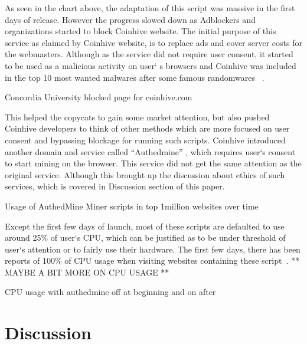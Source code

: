 As seen in the chart above, the adaptation of this script was massive in the first days of release. However the progress slowed down as Adblockers and organizations started to block Coinhive website. The initial purpose of this service as claimed by Coinhive website, is to replace ads and cover server costs for the webmasters. Although as the service did not require user consent, it started to be used as a malicious activity on user` s browsers and Coinhive was included in the top 10 most wanted malwares after some famous randomwares ~\cite{checkpoint}. 

\begin{center}
	\caption{Concordia University blocked page for coinhive.com}
\end{center}

This helped the copycats to gain some market attention, but also pushed Coinhive developers to think of other methods which are more focused on user consent and bypassing blockage for running such scripts. Coinhive introduced another domain and service called ``Authedmine'' , which requires user`s consent to start mining on the browser. This service did not get the same attention as the original service. Although this brought up the discussion about ethics of such services, which is covered in Discussion section of this paper. 

\begin{center}
	\caption{Usage of AuthedMine Miner scripts in top 1million websites over time}
\end{center}

Except the first few days of launch, most of these scripts are defaulted to use around 25\% of user`s CPU, which can be justified as to be under threshold of user`s attention or to fairly use their hardware. The first few days, there has been reports of 100\% of CPU usage when visiting websites containing these script~\cite{piratesbayblog}. ** MAYBE A BIT MORE ON CPU USAGE **

\begin{center}
	\caption{CPU usage with authedmine off at beginning and on after}
\end{center}

\section{Discussion}

